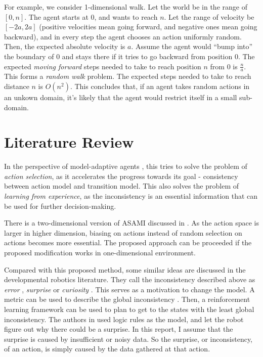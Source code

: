 \documentclass[10pt]{IEEEtran}
\begin{document}
For example, we consider 1-dimensional walk. Let the world be in the
range of $[0,n]$. The agent starts at 0, and wants to reach $n$. Let
the range of velocity be $[-2a, 2a]$ (positive velocities mean going
forward, and negative ones mean going backward), and in every step the
agent chooses an action uniformly random.  Then, the expected absolute
velocity is $a$. Assume the agent would ``bump into'' the boundary of
$0$ and stays there if it tries to go backward from position $0$. The
expected \textit{moving forward} steps needed to take to reach
position $n$ from $0$ is $\frac{n}{a}$. This forms a \textit{random walk}
\cite{motwani1995randomized} problem. The expected steps needed to
take to reach distance $n$ is $O(n^2)$. This concludes that, if an
agent takes random actions in an unkown domain, it's likely that the
agent would restrict itself in a small sub-domain.

\section{Literature Review}

In the perspective of model-adaptive agents \cite{maes1993modeling},
this tries to solve the problem of \textit{action selection}, as it
accelerates the progress towards its goal - consistency between action
model and transition model. This also solves the problem of
\textit{learning from experience}, as the inconsistency is an
essential information that can be used for further decision-making.

There is a two-dimensional version of ASAMI discussed in
\cite{ICRA08-stronger}.  As the action space is larger in higher
dimension, biasing on actions instead of random selection on actions
becomes more essential. The proposed approach can be proceeded if the
proposed modification works in one-dimensional environment.

Compared with this proposed method, some similar ideas are discussed
in the developmental robotics literature. They call the inconsistency
described above as \textit{error} \cite{oudeyer2006discovering},
\textit{surprise} \cite{ranasinghe2008surprise} or \textit{curiosity}
\cite{schmidhuber2006developmental}. This serves as a motivation to
change the model. A metric can be used to describe the global
inconsistency \cite{oudeyer2006discovering}. Then, a reinforcement
learning framework can be used to plan to get to the states with the
least global inconsistency. The authors in
\cite{ranasinghe2008surprise} used logic rules as the model, and let
the robot figure out why there could be a surprise. In this report, I
assume that the surprise is caused by insufficient or noisy data. So
the surprise, or inconsistency, of an action, is simply caused by the
data gathered at that action.
\end{document}
